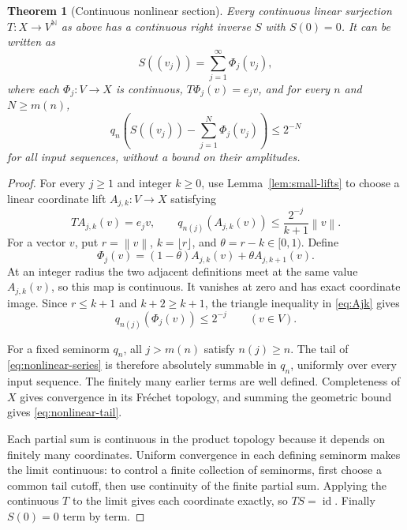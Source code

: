 \documentclass[11pt,a4paper]{article}
\numberwithin{equation}{section}
\newtheorem{theorem}{Theorem}[section]
\theoremstyle{definition}
\theoremstyle{remark}
\newcommand{\N}{\mathbb N}
\newcommand{\norm}[1]{\left\lVert#1\right\rVert}
\newcommand{\id}{\operatorname{id}}
\begin{document}
\begin{theorem}[Continuous nonlinear section]\label{thm:nonlinear}
Every continuous linear surjection $T:X\to V^\N$ as above has a continuous
right inverse $S$ with $S(0)=0$. It can be written as
\begin{equation}\label{eq:nonlinear-series}
 S((v_j))=\sum_{j=1}^\infty\Phi_j(v_j),
\end{equation}
where each $\Phi_j:V\to X$ is continuous, $T\Phi_j(v)=e_jv$, and for every
$n$ and $N\ge m(n)$,
\begin{equation}\label{eq:nonlinear-tail}
 q_n\!\left(S((v_j))-\sum_{j=1}^N\Phi_j(v_j)\right)\le2^{-N}
\end{equation}
for all input sequences, without a bound on their amplitudes.
\end{theorem}
\begin{proof}
For every $j\ge1$ and integer $k\ge0$, use
Lemma~\ref{lem:small-lifts} to choose a linear coordinate lift $A_{j,k}:V\to X$
satisfying
\begin{equation}\label{eq:Ajk}
 TA_{j,k}(v)=e_jv,
 \qquad q_{n(j)}(A_{j,k}(v))\le\frac{2^{-j}}{k+1}\norm v.
\end{equation}
For a vector $v$, put $r=\norm v$, $k=\lfloor r\rfloor$, and
$\theta=r-k\in[0,1)$. Define
\begin{equation}\label{eq:Phi}
 \Phi_j(v)=(1-\theta)A_{j,k}(v)+\theta A_{j,k+1}(v).
\end{equation}
At an integer radius the two adjacent definitions meet at the same value
$A_{j,k}(v)$, so this map is continuous. It vanishes at zero and has exact
coordinate image. Since $r\le k+1$ and $k+2\ge k+1$, the triangle inequality
in \eqref{eq:Ajk} gives
\begin{equation}\label{eq:uniform-small}
 q_{n(j)}(\Phi_j(v))\le2^{-j}\qquad(v\in V).
\end{equation}

For a fixed seminorm $q_n$, all $j>m(n)$ satisfy $n(j)\ge n$. The tail of
\eqref{eq:nonlinear-series} is therefore absolutely summable in $q_n$,
uniformly over every input sequence. The finitely many earlier terms are
well defined. Completeness of $X$ gives convergence in its Fr\'echet topology,
and summing the geometric bound gives \eqref{eq:nonlinear-tail}.

Each partial sum is continuous in the product topology because it depends
on finitely many coordinates. Uniform convergence in each defining seminorm
makes the limit continuous: to control a finite collection of seminorms,
first choose a common tail cutoff, then use continuity of the finite partial
sum. Applying the continuous $T$ to the limit gives each coordinate exactly,
so $TS=\id$. Finally $S(0)=0$ term by term.
\end{proof}
\end{document}
